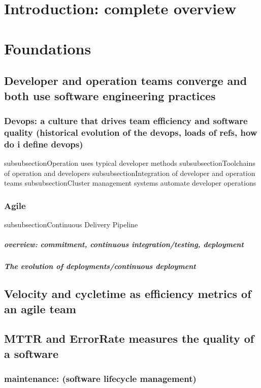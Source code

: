 
\chapter{Introduction: complete overview}
\chapter{Foundations}
\section{Developer and operation teams converge and both use software engineering practices}
\subsection{Devops: a culture that drives team efficiency and software quality (historical evolution of the devops, loads of refs, how do i define devops)}
subsubsection{Operation uses typical developer methods}
subsubsection{Toolchains of operation and developers}
subsubsection{Integration of developer and operation teams}
subsubsection{Cluster management systems automate developer operations}

\subsection{Agile}
subsubsection{Continuous Delivery Pipeline}
\paragraph{overview: commitment, continuous integration/testing, deployment}
\paragraph{The evolution of deployments/continuous deployment}
\section{Velocity and cycletime as efficiency metrics of an agile team}
\section{MTTR and ErrorRate measures the quality of a software}

\subsection{maintenance: (software lifecycle management)}
